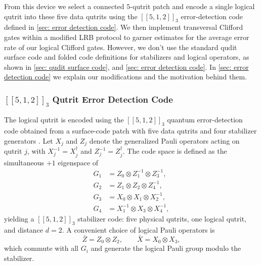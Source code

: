 From this device we select a connected $5$-qutrit patch and encode a single logical qutrit into these five data qutrits using the $[[5,1,2]]_3$ error-detection code defined in \autoref{sec: error detection code}. We then implement transversal Clifford gates within a modified LRB protocol to garner estimates for the average error rate of our logical Clifford gates. However, we don't use the standard qudit surface code and folded code definitions for stabilizers and logical operators, as shown in \autoref{sec: qudit surface code}, \cite{Moussa2016} and \autoref{sec: error detection code}. In \autoref{sec: error detection code} we explain our modifications and the motivation behind them. 


\subsubsection{$[[5,1,2]]_3$ Qutrit Error Detection Code} \label{sec: error detection code}

The logical qutrit is encoded using the $[[5,1,2]]_3$ quantum error-detection code obtained from a surface-code patch with five data qutrits and four stabilizer generators \cite{Moussa2016}. Let
$X_j$ and $Z_j$ denote the generalized Pauli operators acting on
qutrit $j$, with $X_j^{-1}=X_j^\dagger$ and $Z_j^{-1}=Z_j^\dagger$. The
code space is defined as the simultaneous $+1$ eigenspace of
\begin{align}
  G_1 &= Z_0 \otimes Z_1^{-1} \otimes Z_3^{-1}, \label{eq:s1}\\
  G_2 &= Z_1 \otimes Z_2 \otimes Z_4^{-1}, \\
  G_3 &= X_0 \otimes X_1 \otimes X_2^{-1}, \\
  G_4 &= X_1^{-1} \otimes X_3 \otimes X_4^{-1},
  \label{eq:s4}
\end{align}
yielding a $[[5,1,2]]_3$ stabilizer code: five physical qutrits, one logical qutrit, and distance $d=2$. A convenient choice of logical Pauli operators is
\begin{equation}
  \bar Z = Z_0 \otimes Z_2, \qquad
  \bar X = X_0 \otimes X_3,
  \label{eq:logicalPauli}
\end{equation}
which commute with all $G_i$ and generate the logical Pauli group modulo the stabilizer.

